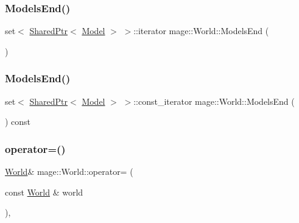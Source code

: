 \hypertarget{classmage_1_1_world_aa52fa727f94a855e55d9fed72be8fd60}{}\label{classmage_1_1_world_aa52fa727f94a855e55d9fed72be8fd60} 
\subsubsection{\texorpdfstring{Models\+End()}{ModelsEnd()}\hspace{0.1cm}{\footnotesize\ttfamily [1/2]}}
{\footnotesize\ttfamily set$<$ \hyperlink{namespacemage_a1e01ae66713838a7a67d30e44c67703e}{Shared\+Ptr}$<$ \hyperlink{classmage_1_1_model}{Model} $>$ $>$\+::iterator mage\+::\+World\+::\+Models\+End (\begin{DoxyParamCaption}{ }\end{DoxyParamCaption})}

\hypertarget{classmage_1_1_world_ad7e9615a659dad4190b16dc28932c007}{}\label{classmage_1_1_world_ad7e9615a659dad4190b16dc28932c007} 
\subsubsection{\texorpdfstring{Models\+End()}{ModelsEnd()}\hspace{0.1cm}{\footnotesize\ttfamily [2/2]}}
{\footnotesize\ttfamily set$<$ \hyperlink{namespacemage_a1e01ae66713838a7a67d30e44c67703e}{Shared\+Ptr}$<$ \hyperlink{classmage_1_1_model}{Model} $>$ $>$\+::const\+\_\+iterator mage\+::\+World\+::\+Models\+End (\begin{DoxyParamCaption}{ }\end{DoxyParamCaption}) const}

\hypertarget{classmage_1_1_world_aa7074e3847c9fbe1466aa833f194eed0}{}\label{classmage_1_1_world_aa7074e3847c9fbe1466aa833f194eed0} 
\subsubsection{\texorpdfstring{operator=()}{operator=()}\hspace{0.1cm}{\footnotesize\ttfamily [1/2]}}
{\footnotesize\ttfamily \hyperlink{classmage_1_1_world}{World}\& mage\+::\+World\+::operator= (\begin{DoxyParamCaption}\item[{const \hyperlink{classmage_1_1_world}{World} \&}]{world }\end{DoxyParamCaption})\hspace{0.3cm}{\ttfamily [private]}, {\ttfamily [delete]}}

